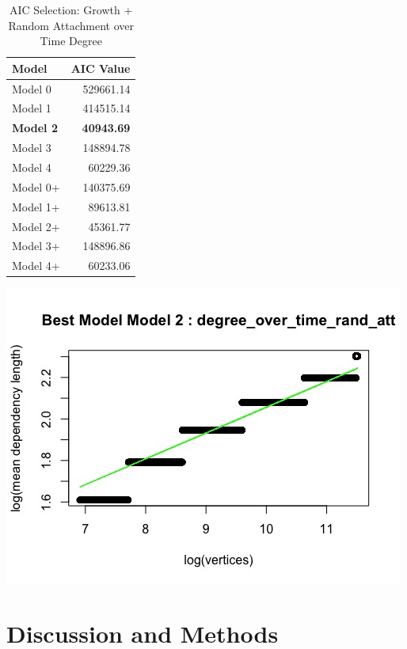 \documentclass[12pt, a4paper]{article}
\begin{document}
\begin{table}[H]
    \centering
    \begin{tabular}{l r}
        Model & AIC Value\\
        \hline
        Model 0  &  529661.14\\
        Model 1  &  414515.14\\
        \textbf{Model 2}  &  \textbf{40943.69}\\
        Model 3  &  148894.78\\
        Model 4  &  60229.36\\
        Model 0+  &  140375.69\\
        Model 1+  &  89613.81\\
        Model 2+  & 45361.77\\
        Model 3+  &  148896.86\\
        Model 4+  &  60233.06\\
    \end{tabular}
    \caption{AIC Selection: Growth + Random Attachment over Time Degree}
    \label{table:time_grow_ran_att_1}
\end{table}


\begin{minipage}[t]{\linewidth}
    \includegraphics[width=\textwidth]{time_growth_degree_best_fit_rand_att}
    \captionsetup{type=figure}
    \label{fig:time_growth_degree_best_fit_rand_att}
  \end{minipage}

\section{Discussion and Methods}
\end{document}
